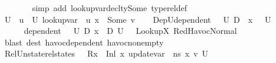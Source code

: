 \begin{isabellebody}
\ \ \ \ \ \ \isamarkupfalse%
\ {\isacharparenleft}{\kern0pt}simp\ add{\isacharcolon}{\kern0pt}\ lookup{\isacharunderscore}{\kern0pt}var{\isacharunderscore}{\kern0pt}decl{\isacharunderscore}{\kern0pt}ty{\isacharunderscore}{\kern0pt}Some\ type{\isacharunderscore}{\kern0pt}rel{\isacharunderscore}{\kern0pt}def{\isacharparenright}{\kern0pt}\isanewline
\ \ \isamarkupfalse%
\ {\isacharquery}{\kern0pt}U{}\ {\isacharequal}{\kern0pt}\ {\isachardoublequoteopen}{\isacharbraceleft}{\kern0pt}u{\isacharprime}{\kern0pt}\ {\isasymin}\ U{}{\isachardot}{\kern0pt}\ lookup{\isacharunderscore}{\kern0pt}var\ {\isasymLambda}{\isacharprime}{\kern0pt}\ u{\isacharprime}{\kern0pt}\ x{\isacharprime}{\kern0pt}\ {\isacharequal}{\kern0pt}\ Some\ v{\isacharbraceright}{\kern0pt}{\isachardoublequoteclose}\isanewline
\ \ \isamarkupfalse%
\ DepU{}{\isacharcolon}{\kern0pt}{\isachardoublequoteopen}dependent\ {\isasymLambda}{\isacharprime}{\kern0pt}\ {\isasymOmega}\ {\isacharquery}{\kern0pt}U{}\ {\isacharparenleft}{\kern0pt}D{}\ {\isasymunion}\ {\isacharbraceleft}{\kern0pt}x{\isacharprime}{\kern0pt}{\isacharbraceright}{\kern0pt}{\isacharparenright}{\kern0pt}{\isachardoublequoteclose}\ \ \ {\isachardoublequoteopen}{\isacharquery}{\kern0pt}U{}\ {\isasymnoteq}\ {\isacharbraceleft}{\kern0pt}{\isacharbraceright}{\kern0pt}{\isachardoublequoteclose}\isanewline
\ \ \ \ \isamarkupfalse%
\ {\isacartoucheopen}dependent\ {\isasymLambda}{\isacharprime}{\kern0pt}\ {\isasymOmega}\ U{}\ D{}{\isacartoucheclose}\ {\isacartoucheopen}x{\isacharprime}{\kern0pt}\ {\isasymnotin}\ D{}{\isacartoucheclose}\ {\isacartoucheopen}U{}\ {\isasymnoteq}\ {\isacharbraceleft}{\kern0pt}{\isacharbraceright}{\kern0pt}{\isacartoucheclose}\ LookupX{\isacharprime}{\kern0pt}\ RedHavocNormal\isanewline
\ \ \ \isamarkupfalse%
\ {\isacharparenleft}{\kern0pt}blast\ dest{\isacharcolon}{\kern0pt}\ havoc{\isacharunderscore}{\kern0pt}dependent\ havoc{\isacharunderscore}{\kern0pt}non{\isacharunderscore}{\kern0pt}empty{\isacharparenright}{\kern0pt}{\isacharplus}{\kern0pt}\isanewline
\ \ \isamarkupfalse%
\ RelU{}{\isacharcolon}{\kern0pt}{\isachardoublequoteopen}nstate{\isacharunderscore}{\kern0pt}rel{\isacharunderscore}{\kern0pt}states\ {\isasymLambda}\ {\isasymLambda}{\isacharprime}{\kern0pt}\ {\isacharparenleft}{\kern0pt}R{\isacharparenleft}{\kern0pt}x\ {\isasymmapsto}\ {\isacharparenleft}{\kern0pt}Inl\ x{\isacharprime}{\kern0pt}{\isacharparenright}{\kern0pt}{\isacharparenright}{\kern0pt}{\isacharparenright}{\kern0pt}\ {\isacharparenleft}{\kern0pt}update{\isacharunderscore}{\kern0pt}var\ {\isasymLambda}\ ns\ x\ v{\isacharparenright}{\kern0pt}\ {\isacharquery}{\kern0pt}U{}{\isachardoublequoteclose}\ \isamarkupfalse%

\end{isabellebody}
